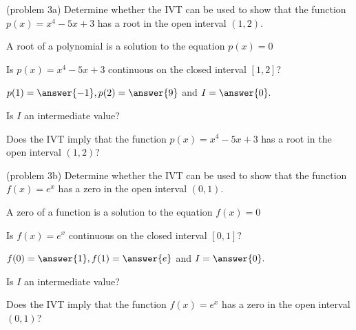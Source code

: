 \documentclass[handout]{ximera}
\begin{document}
\begin{problem}(problem 3a)
Determine whether the IVT can be used to show that the function $p(x) = x^4 - 5x +3$ has a root in the open interval $(1,2)$.\\
\begin{hint}
A root of a polynomial is a solution to the equation $p(x) = 0$
\end{hint}
Is $p(x) = x^4 - 5x + 3$ continuous on the closed interval $[1,2]$? 
\begin{center}
\begin{multipleChoice}
\end{multipleChoice}
\end{center}

$p(1) = \answer{-1}, p(2) = \answer{9}$ and $I = \answer{0}.$

Is $I$ an intermediate value? 
\begin{multipleChoice}
\end{multipleChoice}

Does the IVT imply that the function $p(x) = x^4 - 5x + 3$ has a root in the open interval $(1, 2)$?

\begin{multipleChoice}
\end{multipleChoice}
\end{problem}


\begin{problem}(problem 3b)
Determine whether the IVT can be used to show that the function $f(x) = e^x$ has a zero in the open interval $(0,1)$.
\begin{hint}
A zero of a function is a solution to the equation $f(x) = 0$
\end{hint}
Is $f(x) = e^x$ continuous on the closed interval $[0,1]$? 
\begin{center}
\begin{multipleChoice}
\end{multipleChoice}
\end{center}

$f(0) = \answer{1}, f(1) = \answer{e}$ and $I = \answer{0}.$

Is $I$ an intermediate value? 
\begin{multipleChoice}
\end{multipleChoice}

Does the IVT imply that the function $f(x) = e^x$ has a zero in the open interval $(0, 1)$?

\begin{multipleChoice}
\end{multipleChoice}
\end{problem}
\end{document}
